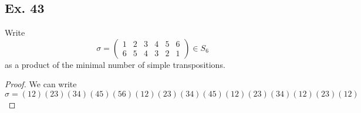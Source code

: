 \documentclass{article}
\newenvironment{hwproof}[1]
{
    #1
    \begin{proof}
}{
    \end{proof}
}
\begin{document}
\subsection*{Ex. 43}
\begin{hwproof}
    {
        Write
        \begin{equation*}
            \sigma = \begin{pmatrix}
                1 & 2 & 3 & 4 & 5 & 6 \\
                6 & 5 & 4 & 3 & 2 & 1
            \end{pmatrix}
            \in S_6
        \end{equation*}
        as a product of the minimal number of simple transpositions.
    }

    We can write
    \begin{equation*}
        \sigma = (12)(23)(34)(45)(56)(12)(23)(34)(45)(12)(23)(34)(12)(23)(12)
    \end{equation*}
\end{hwproof}
\end{document}
